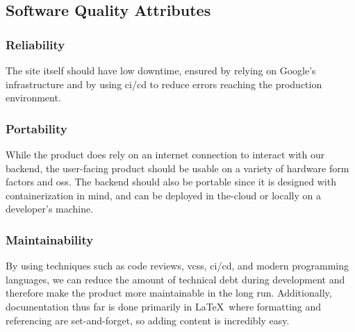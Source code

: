     \subsection{Software Quality Attributes}\label{sec:quality-attributes}
        \subsubsection{Reliability}
            The site itself should have low downtime, ensured by relying on Google's infrastructure and by using \gls{ci}/\gls{cd} to reduce errors reaching the production environment. 
        \subsubsection{Portability}
            While the product does rely on an internet connection to interact with our backend, the user-facing product should be usable on a variety of hardware form factors and \glspl{os}. The backend should also be portable since it is designed with containerization in mind, and can be deployed in \gls{the-cloud} or locally on a developer's machine.
        \subsubsection{Maintainability}
            By using techniques such as code reviews, \glspl{vcs}, \gls{ci}/\gls{cd}, and modern programming languages, we can reduce the amount of technical debt during development and therefore make the product more maintainable in the long run. Additionally, documentation thus far is done primarily in \LaTeX\ where formatting and referencing are set-and-forget, so adding content is incredibly easy.
